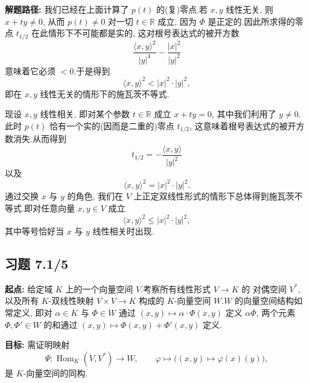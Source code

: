 \noindent\textbf{解题路径:} 我们已经在上面计算了 $p(t)$ 的(复)零点.若 $x, y$ 线性无关, 则 $x + t y \neq 0$, 从而 $p(t) \neq 0$ 对一切 $t \in \mathbb{R}$ 成立, 因为 $\varPhi$ 是正定的.因此所求得的零点 $t_{1/2}$ 在此情形下不可能都是实的, 这对根号表达式的被开方数
\[
\frac{\langle x, y \rangle^2}{|y|^4} - \frac{|x|^2}{|y|^2}
\]
意味着它必须 $< 0$.于是得到
\[
\langle x, y \rangle^2 < |x|^2 \cdot |y|^2,
\]
即在 $x, y$ 线性无关的情形下的施瓦茨不等式.

现设 $x, y$ 线性相关, 即对某个参数 $t \in \mathbb{R}$ 成立 $x + t y = 0$, 其中我们利用了 $y \neq 0$.此时 $p(t)$ 恰有一个实的(因而是二重的)零点 $t_{1/2}$, 这意味着根号表达式的被开方数消失.从而得到
\[
t_{1/2} = -\frac{\langle x, y \rangle}{|y|^2}
\]
以及
\[
\langle x, y \rangle^2 = |x|^2 \cdot |y|^2\text{.}
\]
通过交换 $x$ 与 $y$ 的角色, 我们在 $V$ 上正定双线性形式的情形下总体得到施瓦茨不等式.即对任意向量 $x, y \in V$ 成立
\[
\langle x, y \rangle^2 \leq |x|^2 \cdot |y|^2,
\]
其中等号恰好当 $x$ 与 $y$ 线性相关时出现.

\subsection*{习题 7.1/5}

\noindent\textbf{起点:} 给定域 $K$ 上的一个向量空间 $V$.考察所有线性形式 $V \longrightarrow K$ 的
对偶空间 $V^*$, 以及所有 $K$-双线性映射 $V \times V \longrightarrow K$ 构成的 $K$-向量空间
$W$.$W$ 的向量空间结构如常定义, 即对 $\alpha \in K$ 与 $\varPhi \in W$ 通过
$(x, y) \longmapsto \alpha \cdot \varPhi(x, y)$ 定义 $\alpha \varPhi$, 两个元素
$\varPhi, \varPhi' \in W$ 的和通过 $(x, y) \longmapsto \varPhi(x, y) + \varPhi'(x, y)$ 定义.

\noindent\textbf{目标:} 需证明映射
\[
\varPsi \colon \operatorname{Hom}_K(V, V^*) \longrightarrow W, \qquad \varphi \longmapsto \bigl((x, y) \longmapsto \varphi(x)(y)\bigr),
\]
是 $K$-向量空间的同构.

